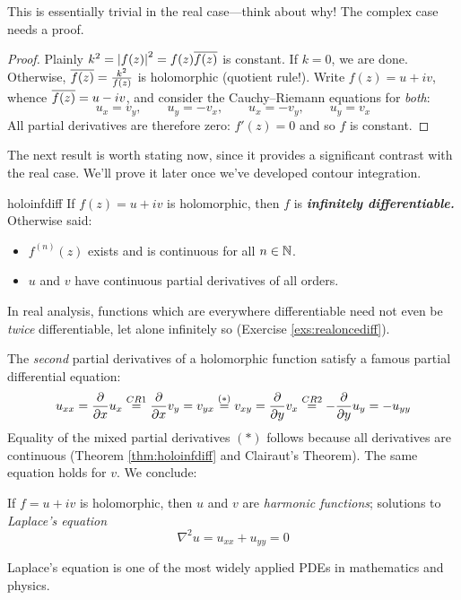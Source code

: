 This is essentially trivial in the real case---think about why! The complex case needs a proof.

\begin{proof}
	Plainly $k^2=\left| f(z)\right|^2=f(z)\overline{f(z)}$ is constant. If $k=0$, we are done. Otherwise, $\overline{f(z)}=\frac{k^2}{f(z)}$ is holomorphic (quotient rule!). Write $f(z)=u+iv$, whence $\overline{f(z)}=u-iv$, and consider the Cauchy--Riemann equations for \emph{both}:
	\[
		u_x=v_y,\qquad u_y=-v_x,\qquad u_x=-v_y,\qquad u_y=v_x
	\]
	All partial derivatives are therefore zero: $f'(z)=0$ and so $f$ is constant.
\end{proof}

The next result is worth stating now, since it provides a significant contrast with the real case. We'll prove it later once we've developed contour integration.

\begin{thm}{}{holoinfdiff}
	If $f(z)=u+iv$ is holomorphic, then $f$ is \emph{\bfseries infinitely differentiable.} Otherwise said:
	\begin{itemize}
	  \item $f^{(n)}(z)$ exists and is continuous for all $n\in\mathbb{N}$.
	  \item $u$ and $v$ have continuous partial derivatives of all orders.
	\end{itemize} 
\end{thm}

In real analysis, functions which are everywhere differentiable need not even be \emph{twice} differentiable, let alone infinitely so (Exercise \ref{exs:realoncediff}).



The \emph{second} partial derivatives of a holomorphic function satisfy a famous partial differential equation:
\[
	u_{xx}=\frac{\partial }{\partial x}u_x\overset{CR1}{=}\frac{\partial }{\partial x}v_y =v_{yx}\overset{(\ast)}{=}v_{xy}=\frac{\partial }{\partial y}v_x\overset{CR2}{=}-\frac{\partial }{\partial y}u_y=-u_{yy}
\]
Equality of the mixed partial derivatives $(\ast)$ follows because all derivatives are continuous (Theorem \ref{thm:holoinfdiff} and Clairaut's Theorem). The same equation holds for $v$. We conclude:

\begin{cor}{}{}
	If $f=u+iv$ is holomorphic, then $u$ and $v$ are \emph{harmonic functions}; solutions to \emph{Laplace's equation}
	\[
		\nabla^2u=u_{xx}+u_{yy}=0
	\]
\end{cor}

Laplace's equation is one of the most widely applied PDEs in mathematics and physics.

